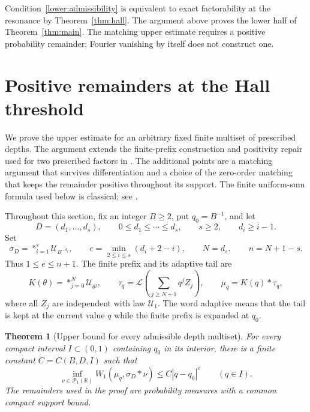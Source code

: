 \documentclass[11pt,letterpaper]{article}
\newtheorem{theorem}{Theorem}[section]
\theoremstyle{definition}
\theoremstyle{remark}
\newcommand{\R}{\mathbb R}
\newcommand{\Un}{\mathcal U}
\newcommand{\Law}{\mathcal L}
\begin{document}
Condition~\eqref{lower:admissibility} is equivalent to exact
factorability at the resonance by Theorem~\ref{thm:hall}.  The argument
above proves the lower half of Theorem~\ref{thm:main}.  The matching
upper estimate requires a positive probability remainder; Fourier
vanishing by itself does not construct one.


\section{Positive remainders at the Hall threshold}\label{upper:section}

We prove the upper estimate for an arbitrary fixed finite multiset of
prescribed depths.  The argument extends the finite-prefix construction and
positivity repair used for two prescribed factors in
\cite{repo-contact}.  The additional points are a matching argument that
survives differentiation and a choice of the zero-order matching that keeps
the remainder positive throughout its support.  The finite uniform-sum
formula used below is classical; see \cite{BradleyGupta}.

Throughout this section, fix an integer $B\ge2$, put $q_0=B^{-1}$, and let
\[
 D=(d_1,\ldots,d_s),\qquad
 0\le d_1\le\cdots\le d_s,\qquad s\ge2,
 \qquad d_i\ge i-1.
\]
Set
\begin{equation}\label{upper:parameters}
 \sigma_D=\mathop{*}_{i=1}^s\Un_{B^{-d_i}},\qquad
 e=\min_{2\le i\le s}(d_i+2-i),\qquad
 N=d_s,\qquad n=N+1-s.
\end{equation}
Thus $1\le e\le n+1$.  The finite prefix and its adaptive tail are
\begin{equation}\label{upper:prefix-tail}
 K(\theta)=\mathop{*}_{j=0}^{N}\Un_{\theta^j},\qquad
 \tau_q=\Law\!\left(\sum_{j\ge N+1}q^jZ_j\right),\qquad
 \mu_q=K(q)*\tau_q,
\end{equation}
where all $Z_j$ are independent with law $\Un_1$.  The word adaptive means
that the tail is kept at the current value $q$ while the finite prefix is
expanded at $q_0$.

\begin{theorem}[Upper bound for every admissible depth multiset]
\label{upper:theorem}
For every compact interval $I\subset(0,1)$ containing $q_0$ in its interior,
there is a finite constant $C=C(B,D,I)$ such that
\[
 \inf_{\nu\in\mathcal P_1(\R)}W_1(\mu_q,\sigma_D*\nu)
 \le C|q-q_0|^e\qquad(q\in I).
\]
The remainders used in the proof are probability measures with a common
compact support bound.
\end{theorem}
\end{document}
